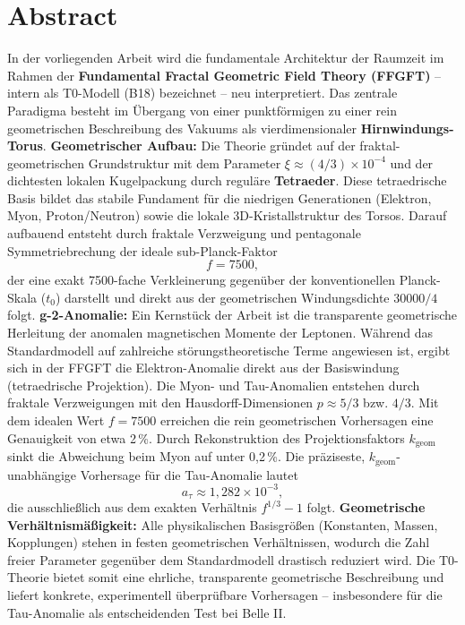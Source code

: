 \section*{Abstract}
		In der vorliegenden Arbeit wird die fundamentale Architektur der Raumzeit im Rahmen der \textbf{Fundamental Fractal Geometric Field Theory (FFGFT)} – intern als T0-Modell (B18) bezeichnet – neu interpretiert. Das zentrale Paradigma besteht im Übergang von einer punktförmigen zu einer rein geometrischen Beschreibung des Vakuums als vierdimensionaler \textbf{Hirnwindungs-Torus}.
		\textbf{Geometrischer Aufbau:} Die Theorie gründet auf der fraktal-geometrischen Grundstruktur mit dem Parameter $\xi \approx (4/3)\times 10^{-4}$ und der dichtesten lokalen Kugelpackung durch reguläre \textbf{Tetraeder}. Diese tetraedrische Basis bildet das stabile Fundament für die niedrigen Generationen (Elektron, Myon, Proton/Neutron) sowie die lokale 3D-Kristallstruktur des Torsos. Darauf aufbauend entsteht durch fraktale Verzweigung und pentagonale Symmetriebrechung der ideale sub-Planck-Faktor
		\begin{equation*}
			f = 7500,
		\end{equation*}
		der eine exakt 7500-fache Verkleinerung gegenüber der konventionellen Planck-Skala ($t_0$) darstellt und direkt aus der geometrischen Windungsdichte $30000/4$ folgt.
		\textbf{g-2-Anomalie:} Ein Kernstück der Arbeit ist die transparente geometrische Herleitung der anomalen magnetischen Momente der Leptonen. Während das Standardmodell auf zahlreiche störungstheoretische Terme angewiesen ist, ergibt sich in der FFGFT die Elektron-Anomalie direkt aus der Basiswindung (tetraedrische Projektion). Die Myon- und Tau-Anomalien entstehen durch fraktale Verzweigungen mit den Hausdorff-Dimensionen $p \approx 5/3$ bzw. $4/3$. Mit dem idealen Wert $f = 7500$ erreichen die rein geometrischen Vorhersagen eine Genauigkeit von etwa 2\,\%. Durch Rekonstruktion des Projektionsfaktors $k_\text{geom}$ sinkt die Abweichung beim Myon auf unter 0{,}2\,\%. Die präziseste, $k_\text{geom}$-unabhängige Vorhersage für die Tau-Anomalie lautet
		\begin{equation*}
			a_\tau \approx 1{,}282 \times 10^{-3},
		\end{equation*}
		die ausschließlich aus dem exakten Verhältnis $f^{1/3} - 1$ folgt.
		\textbf{Geometrische Verhältnismäßigkeit:} Alle physikalischen Basisgrößen (Konstanten, Massen, Kopplungen) stehen in festen geometrischen Verhältnissen, wodurch die Zahl freier Parameter gegenüber dem Standardmodell drastisch reduziert wird. Die T0-Theorie bietet somit eine ehrliche, transparente geometrische Beschreibung und liefert konkrete, experimentell überprüfbare Vorhersagen – insbesondere für die Tau-Anomalie als entscheidenden Test bei Belle II.

